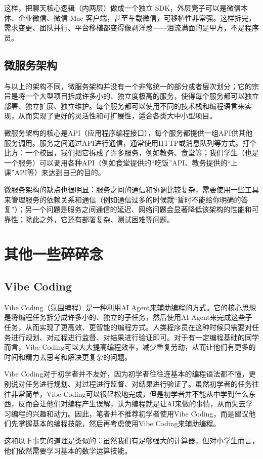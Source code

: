 这样，把聊天核心逻辑（内两层）做成一个独立 SDK，外层壳子可以是微信本体、企业微信、微信 Mac 客户端，甚至车载微信，可移植性非常强。这样拆完，需求变更、团队并行、平台移植都变得像剥洋葱——泪流满面的是甲方，不是程序员。

\subsection{微服务架构}

与以上的架构不同，微服务架构并没有一个非常统一的部分或者层次划分；它的宗旨是将一个大型项目拆成许多小的、独立度极高的服务，使得每个服务都可以独立部署、独立扩展、独立维护。每个服务都可以使用不同的技术栈和编程语言来实现，从而实现了更好的灵活性和可扩展性，适合各类大中小型项目。

微服务架构的核心是API（应用程序编程接口），每个服务都提供一组API供其他服务调用。服务之间通过API进行通信，通常使用HTTP或消息队列等方式。打个比方：一个校园，我们把它拆成了许多服务，例如教务、食堂等；我们学生（也是一个服务）可以调用各种API（例如食堂提供的“吃饭”API、教务提供的“上课”API等）来达到自己的目的。

微服务架构的缺点也很明显：服务之间的通信和协调比较复杂，需要使用一些工具来管理服务的依赖关系和通信（例如通信过多的时候就“暂时不能给你明确的答复”）；另一个问题是服务之间通信的延迟、网络问题会显著降低该架构的性能和可靠性；除此之外，它还有部署复杂、测试困难等问题。

\section{其他一些碎碎念}

\subsection{Vibe Coding}\label{sec:vibe-coding}

Vibe Coding（氛围编程）是一种利用AI Agent来辅助编程的方式。它的核心思想是将编程任务拆分成许多小的、独立的子任务，然后使用AI Agent来完成这些子任务，从而实现了更高效、更智能的编程方式。人类程序员在这种时候只需要对任务进行规划、对过程进行监督、对结果进行验证即可。对于有一定编程基础的同学而言，Vibe Coding可以大大提高编程效率，减少重复劳动，从而让他们有更多的时间和精力去思考和解决更复杂的问题。

\begin{caution}
  Vibe Coding对于初学者并不友好，因为初学者往往连基本的编程语法都不懂，更别说对任务进行规划、对过程进行监督、对结果进行验证了。虽然初学者的任务往往非常简单，Vibe Coding可以很轻松地完成，但是初学者并不能从中学到什么东西，反而会让他们对编程产生误解，认为编程就是让AI来做的事情，从而失去学习编程的兴趣和动力。因此，笔者并不推荐初学者使用Vibe Coding，而是建议他们先掌握基本的编程技能，然后再考虑使用Vibe Coding来辅助编程。

  这和以下事实的道理是类似的：虽然我们有足够强大的计算器，但对小学生而言，他们依然需要学习基本的数学运算技能。
\end{caution}

